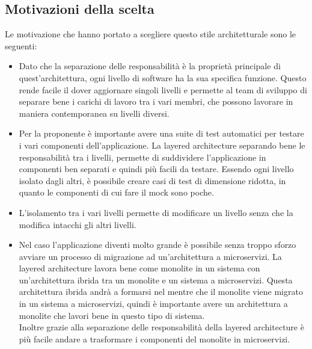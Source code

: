 \subsection{Motivazioni della scelta}
Le motivazione che hanno portato a scegliere questo stile architetturale sono le seguenti:
\begin{itemize}
    \item Dato che la separazione delle responsabilità è la proprietà principale di quest'architettura,
        ogni livello di software ha la sua specifica funzione. Questo rende facile il dover aggiornare 
        singoli livelli e permette al team di sviluppo di separare bene i carichi di lavoro tra i vari 
        membri, che possono lavorare in maniera contemporanea su livelli diversi.
    \item Per la proponente è importante avere una suite di test automatici per testare i vari componenti
        dell'applicazione. La layered architecture separando bene le responsabilità tra i livelli, 
        permette di suddividere l'applicazione in componenti ben separati e quindi più facili da testare.
        Essendo ogni livello isolato dagli altri, è possibile creare casi di test di dimensione ridotta, 
        in quanto le componenti di cui fare il mock sono poche.
    \item L'isolamento tra i vari livelli permette di modificare un livello senza che la modifica intacchi
        gli altri livelli.
    \item Nel caso l'applicazione diventi molto grande è possibile senza troppo sforzo avviare un processo
        di migrazione ad un'architettura a microservizi. La layered architecture lavora bene come monolite 
        in un sistema con un'architettura ibrida tra un monolite e un sistema a microservizi. Questa architettura
        ibrida andrà a formarsi nel mentre che il monolite viene migrato in un sistema a microservizi, quindi 
        è importante avere un architettura a monolite che lavori bene in questo tipo di sistema.
        \\
        Inoltre grazie alla separazione delle responsabilità della layered architecture è più facile andare
        a trasformare i componenti del monolite in microservizi.
\end{itemize}

